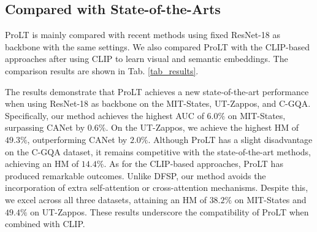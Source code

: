 \documentclass[letterpaper]{article} %
\theoremstyle{definition}
\begin{document}
\subsection{Compared with State-of-the-Arts} \label{subsec.compare}
ProLT is mainly compared with recent methods using fixed ResNet-18 as backbone with the same settings. We also compared ProLT with the CLIP-based approaches \cite{dfsp,csp} after using CLIP \cite{clip} to learn visual and semantic embeddings. The comparison results are shown in Tab. \ref{tab_results}.

The results demonstrate that ProLT achieves a new state-of-the-art performance when using ResNet-18 as backbone on the MIT-States, UT-Zappos, and C-GQA. Specifically, our method achieves the highest AUC of $6.0\%$ on MIT-States, surpassing CANet by $0.6\%$. On the UT-Zappos, we achieve the highest HM of $49.3\%$, outperforming CANet by $2.0\%$. Although ProLT has a slight disadvantage on the C-GQA dataset, it remains competitive with the state-of-the-art methods, achieving an HM of $14.4\%$. As for the CLIP-based approaches, ProLT has produced remarkable outcomes. Unlike DFSP, our method avoids the incorporation of extra self-attention or cross-attention mechanisms. Despite this, we excel across all three datasets, attaining an HM of $38.2\%$ on MIT-States and $49.4\%$ on UT-Zappos. These results underscore the compatibility of ProLT when combined with CLIP.
\end{document}
